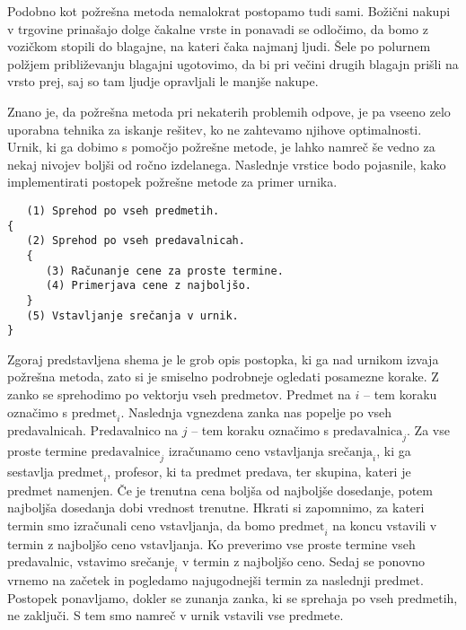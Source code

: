 \documentclass[a4paper, 10pt]{article}
\begin{document}
Podobno kot požrešna metoda nemalokrat postopamo tudi sami. Božični nakupi v trgovine
prinašajo dolge čakalne vrste in ponavadi se odločimo, da bomo z vozičkom stopili do blagajne,
na kateri čaka najmanj ljudi. Šele po polurnem polžjem približevanju blagajni ugotovimo,
da bi pri večini drugih blagajn prišli na vrsto prej, saj so tam ljudje opravljali le
manjše nakupe.

Znano je, da požrešna metoda pri nekaterih problemih odpove, je pa vseeno zelo uporabna
tehnika za iskanje rešitev, ko ne zahtevamo njihove optimalnosti. Urnik, ki ga dobimo s
pomočjo požrešne metode, je lahko namreč še vedno za nekaj nivojev boljši od ročno izdelanega.
Naslednje vrstice bodo pojasnile, kako implementirati postopek požrešne metode za primer urnika.

\begin{verbatim}
   (1) Sprehod po vseh predmetih.
{
   (2) Sprehod po vseh predavalnicah.
   {
      (3) Računanje cene za proste termine.
      (4) Primerjava cene z najboljšo.
   }
   (5) Vstavljanje srečanja v urnik.
}
\end{verbatim}

Zgoraj predstavljena shema je le grob opis postopka, ki ga nad urnikom izvaja požrešna metoda,
zato si je smiselno podrobneje ogledati posamezne korake.
   Z zanko se sprehodimo po vektorju vseh predmetov. Predmet na $i$ -- tem koraku
   označimo s $\text{predmet}_i$.
   Naslednja vgnezdena zanka nas popelje po vseh predavalnicah. Predavalnico na
   $j$ -- tem koraku označimo s $\text{predavalnica}_j$.
   Za vse proste termine $\text{predavalnice}_j$ izračunamo ceno vstavljanja
   $\text{srečanja}_i$, ki ga sestavlja $\text{predmet}_i$, profesor, ki ta predmet predava,
   ter skupina, kateri je predmet namenjen.
   Če je trenutna cena boljša od najboljše dosedanje, potem najboljša dosedanja
   dobi vrednost trenutne. Hkrati si zapomnimo, za kateri termin smo izračunali ceno
   vstavljanja, da bomo $\text{predmet}_i$ na koncu vstavili v termin z najboljšo
   ceno vstavljanja.
   Ko preverimo vse proste termine vseh predavalnic, vstavimo $\text{srečanje}_i$
   v termin z najboljšo ceno.
   Sedaj se ponovno vrnemo na začetek in pogledamo najugodnejši termin za naslednji
   predmet. Postopek ponavljamo, dokler se zunanja zanka, ki se sprehaja po vseh predmetih,
   ne zaključi. S tem smo namreč v urnik vstavili vse predmete.
\end{document}

